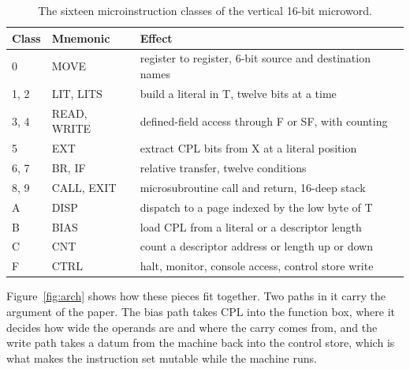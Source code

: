 \documentclass[11pt,a4paper]{article}
\begin{document}
\begin{table}[!htb]
\centering
\caption{The sixteen microinstruction classes of the vertical 16-bit
microword.}
\label{tab:micro}
\begin{tabular}{@{}lll@{}}
\toprule
Class & Mnemonic & Effect \\
\midrule
0 & MOVE & register to register, 6-bit source and destination names \\
1, 2 & LIT, LITS & build a literal in T, twelve bits at a time \\
3, 4 & READ, WRITE & defined-field access through F or SF, with counting \\
5 & EXT & extract CPL bits from X at a literal position \\
6, 7 & BR, IF & relative transfer, twelve conditions \\
8, 9 & CALL, EXIT & microsubroutine call and return, 16-deep stack \\
A & DISP & dispatch to a page indexed by the low byte of T \\
B & BIAS & load CPL from a literal or a descriptor length \\
C & CNT & count a descriptor address or length up or down \\
F & CTRL & halt, monitor, console access, control store write \\
\bottomrule
\end{tabular}
\end{table}

Figure~\ref{fig:arch} shows how these pieces fit together. Two paths in
it carry the argument of the paper. The bias path takes CPL into the
function box, where it decides how wide the operands are and where the
carry comes from, and the write path takes a datum from the machine
back into the control store, which is what makes the instruction set
mutable while the machine runs.
\end{document}
